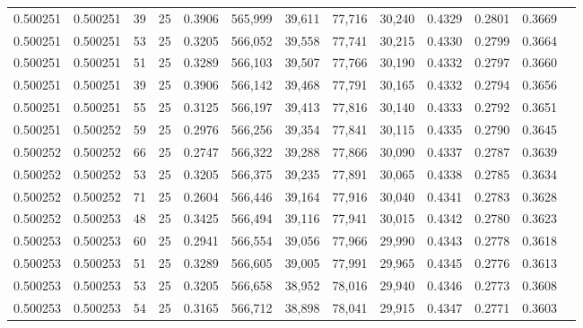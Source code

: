 \begin{tabular}{rrrrrrrrrrrrr}
0.500251 & 0.500251 &    39 &  25 &                                     0.3906 & 565,999 &  39,611 &  77,716 &  30,240 & 0.4329 & 0.2801 & 0.3669 \\
0.500251 & 0.500251 &    53 &  25 &                                     0.3205 & 566,052 &  39,558 &  77,741 &  30,215 & 0.4330 & 0.2799 & 0.3664 \\
0.500251 & 0.500251 &    51 &  25 &                                     0.3289 & 566,103 &  39,507 &  77,766 &  30,190 & 0.4332 & 0.2797 & 0.3660 \\
0.500251 & 0.500251 &    39 &  25 &                                     0.3906 & 566,142 &  39,468 &  77,791 &  30,165 & 0.4332 & 0.2794 & 0.3656 \\
0.500251 & 0.500251 &    55 &  25 &                                     0.3125 & 566,197 &  39,413 &  77,816 &  30,140 & 0.4333 & 0.2792 & 0.3651 \\
0.500251 & 0.500252 &    59 &  25 &                                     0.2976 & 566,256 &  39,354 &  77,841 &  30,115 & 0.4335 & 0.2790 & 0.3645 \\
0.500252 & 0.500252 &    66 &  25 &                                     0.2747 & 566,322 &  39,288 &  77,866 &  30,090 & 0.4337 & 0.2787 & 0.3639 \\
0.500252 & 0.500252 &    53 &  25 &                                     0.3205 & 566,375 &  39,235 &  77,891 &  30,065 & 0.4338 & 0.2785 & 0.3634 \\
0.500252 & 0.500252 &    71 &  25 &                                     0.2604 & 566,446 &  39,164 &  77,916 &  30,040 & 0.4341 & 0.2783 & 0.3628 \\
0.500252 & 0.500253 &    48 &  25 &                                     0.3425 & 566,494 &  39,116 &  77,941 &  30,015 & 0.4342 & 0.2780 & 0.3623 \\
0.500253 & 0.500253 &    60 &  25 &                                     0.2941 & 566,554 &  39,056 &  77,966 &  29,990 & 0.4343 & 0.2778 & 0.3618 \\
0.500253 & 0.500253 &    51 &  25 &                                     0.3289 & 566,605 &  39,005 &  77,991 &  29,965 & 0.4345 & 0.2776 & 0.3613 \\
0.500253 & 0.500253 &    53 &  25 &                                     0.3205 & 566,658 &  38,952 &  78,016 &  29,940 & 0.4346 & 0.2773 & 0.3608 \\
0.500253 & 0.500253 &    54 &  25 &                                     0.3165 & 566,712 &  38,898 &  78,041 &  29,915 & 0.4347 & 0.2771 & 0.3603 \\

\end{tabular}
